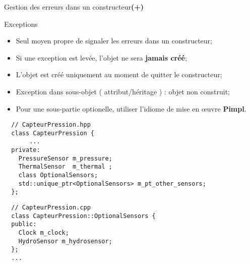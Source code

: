 \documentclass[compress,10pt,aspectratio=169]{beamer}
\begin{document}
  \begin{frame}[fragile]{Gestion des erreurs dans un constructeur{\color{red}\bf\Large (+)}}
  \scriptsize
  \begin{block}{Exceptions}
  \begin{itemize}
    \item Seul moyen propre de signaler les erreurs dans un constructeur;
    \item Si une exception est levée, l'objet ne sera \textbf{jamais créé};
    \item L'objet est créé uniquement au moment de quitter le constructeur;
    \item Exception dans sous-objet ( attribut/héritage ) : objet non construit;
    \item Pour une sous-partie optionelle, utiliser l'idiome de mise en {\oe}uvre \textbf{Pimpl}.
  \end{itemize}
  \end{block}
  \begin{minipage}{0.6\textwidth}
  \begin{verbatim}
  // CapteurPression.hpp
  class CapteurPression {
       ...
  private:
    PressureSensor m_pressure;
    ThermalSensor  m_thermal ;
    class OptionalSensors;
    std::unique_ptr<OptionalSensors> m_pt_other_sensors;
  };
  \end{verbatim}
  \end{minipage}
  \begin{minipage}{0.39\textwidth}  
  \begin{verbatim}
  // CapteurPression.cpp
  class CapteurPression::OptionalSensors {
  public:
    Clock m_clock;
    HydroSensor m_hydrosensor;
  };
  ...
  \end{verbatim}
  \end{minipage}
  \end{frame}
\end{document}
